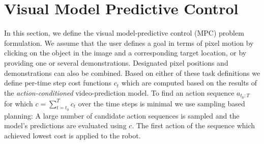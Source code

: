 \section{Visual Model Predictive Control}\label{sec:prelim}
\label{sec:vmpc}

In this section, we define the visual model-predictive control (MPC) problem formulation.  We assume that the user defines a goal in terms of pixel motion by clicking on the object in the image and a corresponding target location, or by providing one or several demonstrations. Designated pixel positions and demonstrations can also be combined. Based on either of these task definitions we define per-time step cost functions $c_t$ which are computed based on the results of the \emph{action-conditioned} video-prediction model. To find an action sequence $a_{t_0:T}$ for which $c = \sum^{T}_{t=t_0}{c_t}$ over the time steps is minimal we use sampling based planning: A large number of candidate action sequences is sampled and the model's predictions are evaluated using $c$. The first action of the sequence which achieved lowest cost is applied to the robot.


